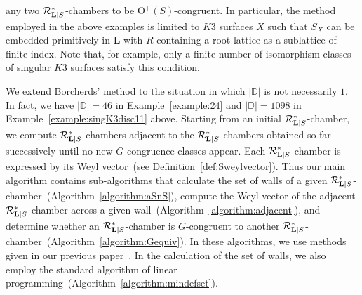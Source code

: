 \documentclass{amsart}
\theoremstyle{plain}
\theoremstyle{definition}
\theoremstyle{remark}
\numberwithin{equation}{section}
\numberwithin{table}{section}
\numberwithin{figure}{section}
\newcommand{\D}{\mathord{\mathbb D}}
\newcommand{\RRR}{\mathord{\mathcal R}}
\newcommand{\OG}{\mathord{\mathrm {O}}}
\renewcommand{\L}{\mathord{\mathbf{L}}}
\newcommand{\Roots}{\RRR}
\newcommand{\sphyp}{\sp*}
\newcommand{\RtsLS}{\Roots_{\L|S}}
\begin{document}
any two  $\RtsLS\sphyp$-chambers 
to be $\OG^+(S)$-congruent.
In particular, the method employed in the above examples  is limited to  $K3$ surfaces $X$
such that $S_X$ can be embedded primitively in $\L$ with $R$ containing  a root lattice
as a sublattice of finite index.
Note that, for example,
only a finite number of isomorphism classes of singular $K3$ surfaces
satisfy this condition.
%
\par
%
We extend Borcherds' method 
to the situation in which   $|\D|$ is not necessarily $1$.
In fact, we have $|\D|=46$ in Example~\ref{example:24} 
and $|\D|=1098$ in Example~\ref{example:singK3disc11} above.
 Starting from an initial $\RtsLS\sphyp$-chamber,
 we compute $\RtsLS\sphyp$-chambers adjacent to the $\RtsLS\sphyp$-chambers obtained so far successively 
 until no new $G$-congruence classes appear.
 Each $\RtsLS\sphyp$-chamber is expressed by its Weyl vector~(see Definition~\ref{def:Sweylvector}).
 Thus our main algorithm contains sub-algorithms
 that calculate the set of walls of a given  $\RtsLS\sphyp$-chamber~(Algorithm~\ref{algorithm:aSnS}),
 compute the Weyl vector of the adjacent $\RtsLS\sphyp$-chamber across a given wall~(Algorithm~\ref{algorithm:adjacent}),
 and determine whether an $\RtsLS\sphyp$-chamber is $G$-congruent to another 
 $\RtsLS\sphyp$-chamber~(Algorithm~\ref{algorithm:Gequiv}).
 In these algorithms,
 we use  methods given in our previous paper~\cite{MR3166075}. 
 In the  calculation of  the set of walls,
 we also employ the standard algorithm of linear programming~(Algorithm~\ref{algorithm:mindefset}).
%
%
\end{document}

